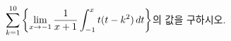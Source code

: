 $\displaystyle\sum_{k=1}^{10}\left\{\lim_{x\to -1}\dfrac{1}{x+1}\int_{-1}^{x} t(t-k^2)\mkern3mu dt\right\}$의 값을 구하시오.
